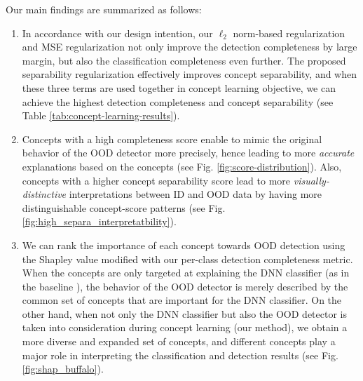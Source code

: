 Our main findings are summarized as follows:
\begin{enumerate}[start=1,label={\bfseries A\arabic*.}]
    \item In accordance with our design intention, our $\ell_2$ norm-based regularization and MSE regularization not only improve the detection completeness by large margin, but also the classification completeness even further. 
    The proposed separability regularization effectively improves concept separability, and when these three terms are used together in concept learning objective, we can achieve the highest detection completeness and concept separability (see Table \ref{tab:concept-learning-results}).
    \item Concepts with a high completeness score enable to mimic the original behavior of the OOD detector more precisely, hence leading to more \textit{accurate} explanations based on the concepts (see Fig. \ref{fig:score-distribution}). 
    Also, concepts with a higher concept separability score lead to more \textit{visually-distinctive} interpretations between ID and OOD data by having more distinguishable concept-score patterns (see Fig. \ref{fig:high_separa_interpretatbility}).
    \item We can rank the importance of each concept towards OOD detection using the Shapley value modified with our per-class detection completeness metric. 
    When the concepts are only targeted at explaining the DNN classifier (as in the baseline \citep{yeh2020completeness}), the behavior of the OOD detector is merely described by the common set of concepts that are important for the DNN classifier.
    On the other hand, when not only the DNN classifier but also the OOD detector is taken into consideration during concept learning (\ie our method), we obtain a more diverse and expanded set of concepts, and different concepts play a major role in interpreting the classification and detection results (see Fig. \ref{fig:shap_buffalo}). 
\end{enumerate}



\fi


